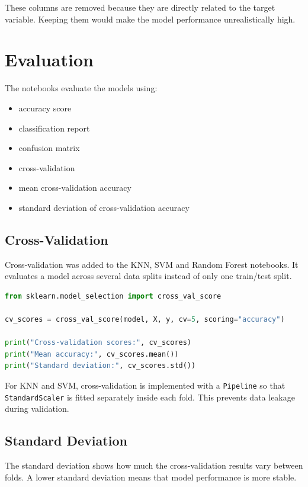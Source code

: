 \documentclass[12pt,a4paper]{article}
\begin{document}
These columns are removed because they are directly related to the target variable. Keeping them would make the model performance unrealistically high.

\section{Evaluation}

The notebooks evaluate the models using:

\begin{itemize}[noitemsep]
    \item accuracy score
    \item classification report
    \item confusion matrix
    \item cross-validation
    \item mean cross-validation accuracy
    \item standard deviation of cross-validation accuracy
\end{itemize}

\subsection{Cross-Validation}

Cross-validation was added to the KNN, SVM and Random Forest notebooks. It evaluates a model across several data splits instead of only one train/test split.

\begin{lstlisting}[language=Python]
from sklearn.model_selection import cross_val_score

cv_scores = cross_val_score(model, X, y, cv=5, scoring="accuracy")

print("Cross-validation scores:", cv_scores)
print("Mean accuracy:", cv_scores.mean())
print("Standard deviation:", cv_scores.std())
\end{lstlisting}

For KNN and SVM, cross-validation is implemented with a \texttt{Pipeline} so that \texttt{StandardScaler} is fitted separately inside each fold. This prevents data leakage during validation.

\subsection{Standard Deviation}

The standard deviation shows how much the cross-validation results vary between folds. A lower standard deviation means that model performance is more stable.
\end{document}
